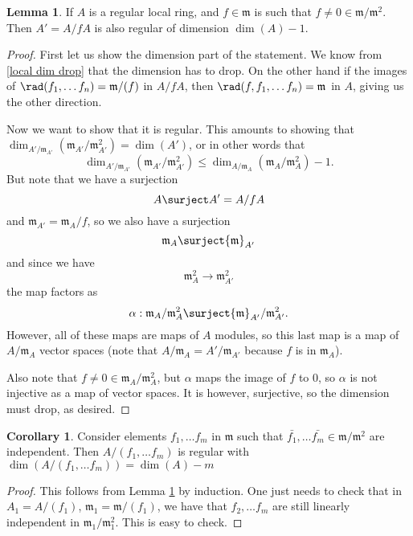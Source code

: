 \documentclass[12 pt]{article}
\theoremstyle{definition}
\newtheorem{cor}[thm]{Corollary}
\newtheorem{lemma}[thm]{Lemma}
\renewcommand{\(}{\left(}
\renewcommand{\)}{\right)}
\newcommand\fm{{\mathfrak m}}
\begin{document}
\begin{lemma}
If $A$ is a regular local ring, and $f \in \fm$ is such that $f \neq 0 \in \fm/\fm^2$. Then $A'=A/fA$ is also regular of dimension $\dim(A)-1$.
\label{reg loc mod f still reg loc}
\end{lemma}
\begin{proof} First let us show the dimension part of the statement. We know from \ref{local dim drop} that the dimension has to drop. On the other hand if the images of $\rad(f_1, \ldots f_n)=\fm/(f)$ in $A/fA$, then $\rad(f,f_1, \ldots f_n)=\fm$ in $A$, giving us the other direction.

Now we want to show that it is regular. This amounts to showing that $\dim_{A'/\fm_{A'}}(\fm_{A'}/\fm_{A'}^2)=\dim(A')$, or in other words that \[\dim_{A'/\fm_{A'}}(\fm_{A'}/\fm_{A'}^2) \leq \dim_{A/\fm_A}(\fm_{A}/\fm_A^2)-1.\]
But note that we have a surjection
\[A \surject A'=A/fA\]
and $\fm_{A'}=\fm_A/f$, so we also have a surjection
\[\fm_A \surject \fm_{A'}\]
and since we have
\[\fm_A^2 \to \fm_{A'}^2\]
the map factors as
\[\alpha: \fm_A/\fm_A^2 \surject \fm_{A'}/\fm_{A'}^2.\]
However, all of these maps are maps of $A$ modules, so this last map is a map of $A/\fm_A$ vector spaces (note that $A/\fm_A=A'/\fm_{A'}$ because $f$ is in $\fm_A$).

Also note that $f \neq 0 \in \fm_A/\fm_A^2$, but $\alpha$ maps the image of $f$ to 0, so $\alpha$ is not injective as a map of vector spaces. It is however, surjective, so the dimension must drop, as desired.
\end{proof}



\begin{cor}  Consider elements $f_1, \ldots f_m$ in $\fm$ such that $\bar{f_1}, \ldots \bar{f_m} \in \fm/\fm^2$ are independent. Then $A/(f_1, \ldots f_m)$ is regular with $\dim(A/(f_1, \ldots f_m))=\dim(A)-m$
\label{reg local mod fs still reg loc}
\end{cor}
\begin{proof} This follows from Lemma \ref{reg loc mod f still reg loc} by induction. One just needs to check that in $A_1=A/(f_1)$, $\fm_1=\fm/(f_1)$, we have that $f_2, \ldots f_m$ are still linearly independent in $\fm_1/\fm_1^2$. This is easy to check.
\end{proof}
\end{document}
